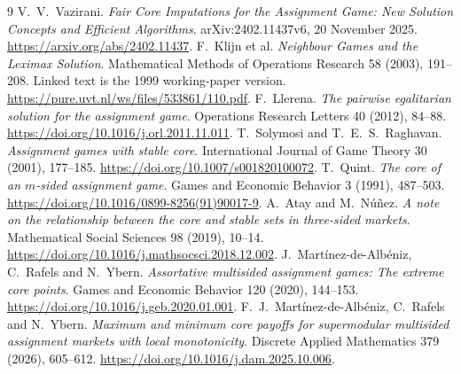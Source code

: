 \documentclass[11pt]{article}
\begin{document}
\begin{thebibliography}{9}
\small
{} V.~V.~Vazirani. \emph{Fair Core Imputations for the Assignment
Game: New Solution Concepts and Efficient Algorithms}. arXiv:2402.11437v6,
20 November 2025. \url{https://arxiv.org/abs/2402.11437}.
 F.~Klijn et al. \emph{Neighbour Games and the Leximax Solution}.
Mathematical Methods of Operations Research 58 (2003), 191--208.
Linked text is the 1999 working-paper version.
\url{https://pure.uvt.nl/ws/files/533861/110.pdf}.
 F.~Llerena. \emph{The pairwise egalitarian solution for the
assignment game}. Operations Research Letters 40 (2012), 84--88.
\url{https://doi.org/10.1016/j.orl.2011.11.011}.
 T.~Solymosi and T.~E.~S.~Raghavan.
\emph{Assignment games with stable core}. International Journal of Game
Theory 30 (2001), 177--185. \url{https://doi.org/10.1007/s001820100072}.
 T.~Quint. \emph{The core of an $m$-sided assignment game}.
Games and Economic Behavior 3 (1991), 487--503.
\url{https://doi.org/10.1016/0899-8256(91)90017-9}.
 A.~Atay and M.~N\'u\~nez. \emph{A note on the relationship
between the core and stable sets in three-sided markets}.
Mathematical Social Sciences 98 (2019), 10--14.
\url{https://doi.org/10.1016/j.mathsocsci.2018.12.002}.
 J.~Mart\'inez-de-Alb\'eniz, C.~Rafels and N.~Ybern.
\emph{Assortative multisided assignment games: The extreme core points}.
Games and Economic Behavior 120 (2020), 144--153.
\url{https://doi.org/10.1016/j.geb.2020.01.001}.
 F.~J.~Mart\'inez-de-Alb\'eniz, C.~Rafels and N.~Ybern.
\emph{Maximum and minimum core payoffs for supermodular multisided assignment
markets with local monotonicity}. Discrete Applied Mathematics 379 (2026),
605--612. \url{https://doi.org/10.1016/j.dam.2025.10.006}.
\end{thebibliography}
\end{document}
